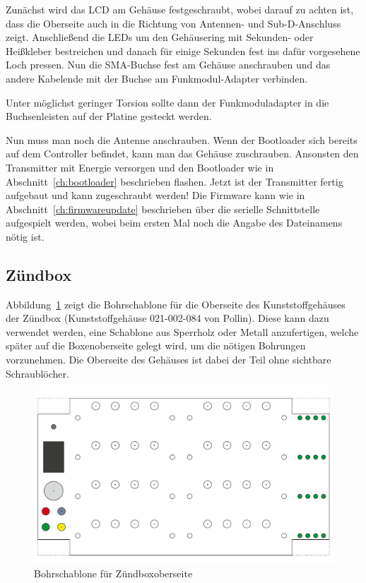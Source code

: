 \documentclass[paper=a4, parskip, numbers=noenddot, toc=listof, headsepline]{scrbook}
\begin{document}
					Zunächst wird das LCD am Gehäuse festgeschraubt, wobei darauf zu achten ist, dass die Oberseite auch in die Richtung von Antennen- und Sub-D-Anschluss zeigt. Anschließend die LEDs um den Gehäusering mit Sekunden- oder Heißkleber bestreichen und danach für einige Sekunden fest ins dafür vorgesehene Loch pressen. Nun die SMA-Buchse fest am Gehäuse anschrauben und das andere Kabelende mit der Buchse am Funkmodul-Adapter verbinden.

					Unter möglichst geringer Torsion sollte dann der Funkmoduladapter in die Buchsenleisten auf der Platine gesteckt werden.

					Nun muss man noch die Antenne anschrauben. Wenn der Bootloader sich bereits auf dem Controller befindet, kann man das Gehäuse zuschrauben. Ansonsten den Transmitter mit Energie versorgen und den Bootloader wie in Abschnitt~\ref{ch:bootloader} beschrieben flashen. Jetzt ist der Transmitter fertig aufgebaut und kann zugeschraubt werden! Die Firmware kann wie in Abschnitt~\ref{ch:firmwareupdate} beschrieben über die serielle Schnittstelle aufgespielt werden, wobei beim ersten Mal noch die Angabe des Dateinamens nötig ist.

				\subsection{Zündbox}
					Abbildung~\ref{fig:zuendboxbohren} zeigt die Bohrschablone für die Oberseite des Kunststoffgehäuses der Zündbox (Kunststoffgehäuse 021-002-084 von Pollin). Diese kann dazu verwendet werden, eine Schablone aus Sperrholz oder Metall anzufertigen, welche später auf die Boxenoberseite gelegt wird, um die nötigen Bohrungen vorzunehmen. Die Oberseite des Gehäuses ist dabei der Teil ohne sichtbare Schraublöcher.

					\begin{figure}
						\centering
						\includegraphics[angle=90,scale=1]{Bilder/Zuendboxbohrschablone}
						\caption{Bohrschablone für Zündboxoberseite}
						\label{fig:zuendboxbohren}
					\end{figure}
\end{document}
